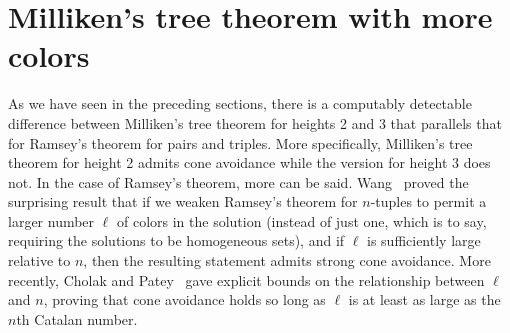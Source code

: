 \begin{figure}[h!]
\begin{center}
{      %
    }
    \label{fig:widget}
\end{center}
\end{figure}


\section{Milliken's tree theorem with more colors}\label{subsect:thin-milliken}

As we have seen in the preceding sections, there is a computably detectable difference between Milliken's tree theorem for heights 2 and 3 that parallels that for Ramsey's theorem for pairs and triples. More specifically, Milliken's tree theorem for height 2 admits cone avoidance while the version for height 3 does not. In the case of Ramsey's theorem, more can be said.
Wang~\cite[Theorem 3.2]{Wang2014Some}
proved the surprising result that if we weaken Ramsey's theorem for $n$-tuples to permit a larger number $\ell$ of colors in the solution (instead of just one, which is to say, requiring the solutions to be homogeneous sets), and if $\ell$ is sufficiently large relative to $n$, then
the resulting statement admits strong cone avoidance. More recently, Cholak and Patey~\cite[Corollary 4.17]{Cholak2019Thin} gave explicit bounds on the relationship between $\ell$ and $n$, proving that cone avoidance holds so long as $\ell$ is at least as large as the $n$th Catalan number.

